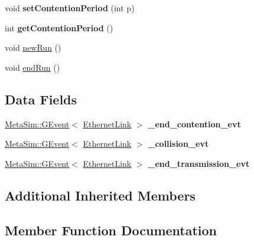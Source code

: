 \begin{DoxyCompactItemize}
\item 
void {\bfseries set\+Contention\+Period} (int p)\hypertarget{classEthernetLink_a000dd9d3dab92fd688bb00e45a604e24}{}\label{classEthernetLink_a000dd9d3dab92fd688bb00e45a604e24}

\item 
int {\bfseries get\+Contention\+Period} ()\hypertarget{classEthernetLink_ac3e13fb6d74f65e88c4605b2bd95f6b4}{}\label{classEthernetLink_ac3e13fb6d74f65e88c4605b2bd95f6b4}

\item 
void \hyperlink{classEthernetLink_ad1e1ffee1fa7dcc8aa7ac4cf564a28fc}{new\+Run} ()
\item 
void \hyperlink{classEthernetLink_a4dcc4c020cb42225283bc11d4f70f32c}{end\+Run} ()
\end{DoxyCompactItemize}
\subsection*{Data Fields}
\begin{DoxyCompactItemize}
\item 
\hyperlink{classMetaSim_1_1GEvent}{Meta\+Sim\+::\+G\+Event}$<$ \hyperlink{classEthernetLink}{Ethernet\+Link} $>$ {\bfseries \+\_\+end\+\_\+contention\+\_\+evt}\hypertarget{classEthernetLink_a715c6db67c5a5825ec413e07fbc5adc7}{}\label{classEthernetLink_a715c6db67c5a5825ec413e07fbc5adc7}

\item 
\hyperlink{classMetaSim_1_1GEvent}{Meta\+Sim\+::\+G\+Event}$<$ \hyperlink{classEthernetLink}{Ethernet\+Link} $>$ {\bfseries \+\_\+collision\+\_\+evt}\hypertarget{classEthernetLink_a45e4c25f0bc214c9d496d13bc6ddc988}{}\label{classEthernetLink_a45e4c25f0bc214c9d496d13bc6ddc988}

\item 
\hyperlink{classMetaSim_1_1GEvent}{Meta\+Sim\+::\+G\+Event}$<$ \hyperlink{classEthernetLink}{Ethernet\+Link} $>$ {\bfseries \+\_\+end\+\_\+transmission\+\_\+evt}\hypertarget{classEthernetLink_a520cbe2cf20c230182895ea6cc44ce12}{}\label{classEthernetLink_a520cbe2cf20c230182895ea6cc44ce12}

\end{DoxyCompactItemize}
\subsection*{Additional Inherited Members}


\subsection{Member Function Documentation}
